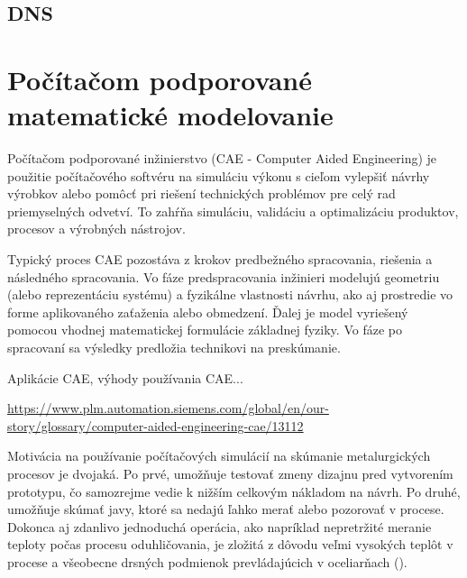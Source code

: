 \documentclass[]{tukediphc}
\begin{document}
\subsection{DNS}

\section{Počítačom podporované matematické modelovanie}

Počítačom podporované inžinierstvo (CAE - Computer Aided Engineering) je použitie počítačového softvéru na simuláciu výkonu s cieľom vylepšiť návrhy výrobkov alebo pomôcť pri riešení technických problémov pre celý rad priemyselných odvetví. To zahŕňa simuláciu, validáciu a optimalizáciu produktov, procesov a výrobných nástrojov.

Typický proces CAE pozostáva z krokov predbežného spracovania, riešenia a následného spracovania. Vo fáze predspracovania inžinieri modelujú geometriu (alebo reprezentáciu systému) a fyzikálne vlastnosti návrhu, ako aj prostredie vo forme aplikovaného zaťaženia alebo obmedzení. Ďalej je model vyriešený pomocou vhodnej matematickej formulácie základnej fyziky. Vo fáze po spracovaní sa výsledky predložia technikovi na preskúmanie.

Aplikácie CAE, výhody používania CAE...

\url{https://www.plm.automation.siemens.com/global/en/our-story/glossary/computer-aided-engineering-cae/13112}

Motivácia na používanie počítačových simulácií na skúmanie metalurgických procesov je dvojaká. Po prvé, umožňuje testovať zmeny dizajnu pred vytvorením prototypu, čo samozrejme vedie k nižším celkovým nákladom na návrh. Po druhé, umožňuje skúmať javy, ktoré sa nedajú ľahko merať alebo pozorovať v procese. Dokonca aj zdanlivo jednoduchá operácia, ako napríklad nepretržité meranie teploty počas procesu oduhličovania, je zložitá z dôvodu veľmi vysokých teplôt v procese a všeobecne drsných podmienok prevládajúcich v oceliarňach (\citep{Ersson2018}).
\end{document}
